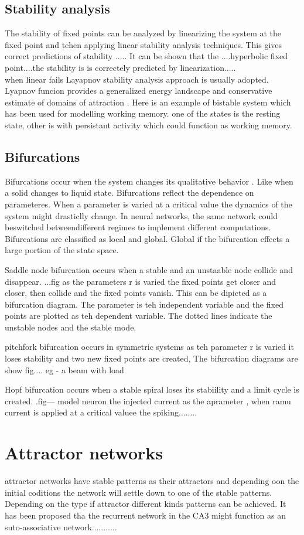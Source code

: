 \subsection{Stability analysis}
The stability of fixed points can be analyzed by linearizing the system at the fixed point and tehen applying linear stability analysis techniques. This gives correct predictions of stability .....
It can be shown that the ....hyperbolic fixed point....the stability is is correctely predicted by linearization.....\\when linear fails Layapnov stability analysis approach is usually adopted. Lyapnov funcion provides a generalized energy landscape and conservative estimate of domains of attraction . Here is an example of bistable system which has been used for modelling working memory. one of the states is the resting state, other is
 with persistant activity which could function as working memory.
\\
\subsection{Bifurcations}
Bifurcations occur when the system changes its qualitative behavior . Like when a solid changes to liquid state. Bifurcations reflect the dependence on parameteres. When a parameter is varied at a critical value the dynamics of the system might drasticlly change. In neural networks, the same network could beswitched betweendifferent regimes to implement different computations. Bifurcations are classified as local and global. Global if the bifurcation effects a large portion of the state space. 

Saddle node bifurcation occurs when a stable and an unstaable node collide and disappear. ...fig as the parameters r is varied the fixed points get closer and closer, then collide and the fixed points vanish. This can be dipicted as a bifurcation diagram. The parameter is teh independent variable and the fixed points are plotted as teh dependent variable. The dotted lines indicate the unstable nodes and the stable mode.

pitchfork bifurcation occurs in symmetric systems as teh parameter r is varied it loses stability and two new fixed points are created, The bifurcation diagrams are show fig.... eg - a beam with load

Hopf bifurcation occurs when a stable spiral loses its stabiility and a limit cycle is created. .fig--- model neuron the injected current as the aprameter , when ramu current is applied at a critical valuee the spiking........

\section{Attractor networks}
attractor networks have stable patterns as their attractors and depending oon the initial coditions the network will settle down to one of the stable patterns. Depending on the type if attractor different kinds patterns can be achieved. It has been proposed tha the recurrent network in the CA3 might function as an suto-associative network...........

